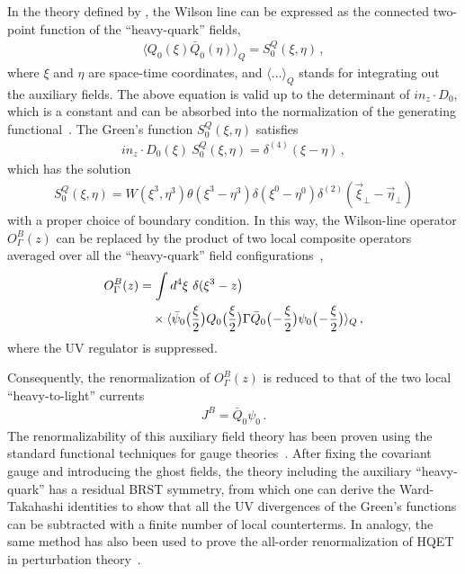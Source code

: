 In the theory defined by , the Wilson line can be expressed as the connected two-point function of the ``heavy-quark'' fields,
\begin{align}
	\langle Q_0(\xi)\bar{Q}_0(\eta) \rangle_Q = S_0^Q(\xi,\eta)\,,
\end{align}
where $\xi$ and $\eta$ are space-time coordinates, and
$\langle...\rangle_Q$ stands for integrating out the auxiliary fields. The above equation is valid up to the determinant of $in_z\cdot D_0$, which is a constant and can be absorbed into the normalization of the generating functional~\cite{Mannel:1991mc}. The Green's function $S_0^Q(\xi,\eta)$ satisfies
\begin{align}
	in_z\cdot D_0(\xi)\ S_0^Q(\xi,\eta) = \delta^{(4)}(\xi-\eta)\,,
\end{align}
which has the solution
\begin{align}
	S_0^Q(\xi,\eta)\! =\! W(\xi^3,\eta^3)\theta(\xi^3-\eta^3)\delta(\xi^0-\eta^0)\delta^{(2)}(\vec{\xi}_\perp -\vec{\eta}_\perp)
\end{align}
with a proper choice of boundary condition.
In this way, the Wilson-line operator $O^B_\Gamma(z)$ can be replaced by the product of two local composite operators averaged over all the ``heavy-quark'' field configurations~\cite{Dorn:1986dt},
\begin{align} \label{eq:product}
	O^B_{\Gamma}(z)& = \int d^4\xi\ \delta(\xi^3-z\big) \nonumber\\
	&\quad\times \langle \bar{\psi}_0\big({\xi\over2}\big) Q_0\big({\xi\over2}\big)\Gamma\bar{Q}_0\big(\!-\!{\xi\over2}\big)\psi_0\big(\!-\!{\xi\over2}\big)\rangle_Q\,,
\end{align}
where the UV regulator is suppressed.

Consequently, the renormalization of $O^B_{\Gamma}(z)$ is reduced to that of the two local ``heavy-to-light'' currents
\begin{align}
	J^B = \bar{Q}_0 \psi_0\,.
\end{align}
The renormalizability of this auxiliary field theory has been proven using the standard functional techniques for gauge theories~\cite{Dorn:1986dt}. After fixing the covariant gauge and introducing the ghost fields, the theory including the auxiliary ``heavy-quark'' has a residual BRST symmetry, from which one can derive the Ward-Takahashi identities to show that all the UV divergences of the Green's functions can be subtracted with a finite number of local counterterms. In analogy, the same method has also been used to prove the all-order renormalization of HQET in perturbation theory~\cite{Bagan:1993zv}.

